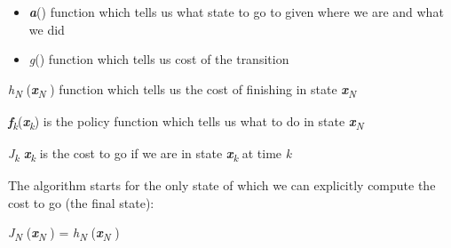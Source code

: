 \documentclass[12pt,twoside]{article}
\begin{document}
\begin{itemize}
	\item {\fontsize{10pt}{12.0pt}\selectfont \textbf{\textit{a}}() function which tells us what state to go to given where we are and what we did\par}\par

	\item {\fontsize{10pt}{12.0pt}\selectfont \textit{g}() function which tells us cost of the transition\par}
\end{itemize}\par


\vspace{\baselineskip}

\vspace{\baselineskip}
	\item {\fontsize{10pt}{12.0pt}\selectfont \textit{h\textsubscript{N} }(\textbf{\textit{x}}\textit{\textsubscript{N} }) function which tells us the cost of finishing in state \textbf{\textit{x}}\textit{\textsubscript{N}}\par}\par

	\item {\fontsize{10pt}{12.0pt}\selectfont \textbf{\textit{f}}\textit{\textsubscript{k}}(\textbf{\textit{x}}\textit{\textsubscript{k}}) is the policy function which tells us what to do in state \textbf{\textit{x}}\textit{\textsubscript{N}}\par}\par

	\item {\fontsize{10pt}{12.0pt}\selectfont \textit{J\textsubscript{k} \textbf{x}\textsubscript{k} }is the cost to go if we are in state \textbf{\textit{x}}\textit{\textsubscript{k} }at time \textit{k}\par}\par


\vspace{\baselineskip}
\begin{adjustwidth}{0.08in}{0.0in}
{\fontsize{10pt}{12.0pt}\selectfont The algorithm starts for the only state of which we can explicitly compute the cost to go (the final state):\par}\par

\end{adjustwidth}


\vspace{\baselineskip}
\begin{adjustwidth}{0.6in}{1.09in}
\begin{Center}
{\fontsize{10pt}{12.0pt}\selectfont \textit{J\textsubscript{N} }(\textbf{\textit{x}}\textit{\textsubscript{N} }) = \textit{h\textsubscript{N} }(\textbf{\textit{x}}\textit{\textsubscript{N} })\par}
\end{Center}\par

\end{adjustwidth}
\end{document}
